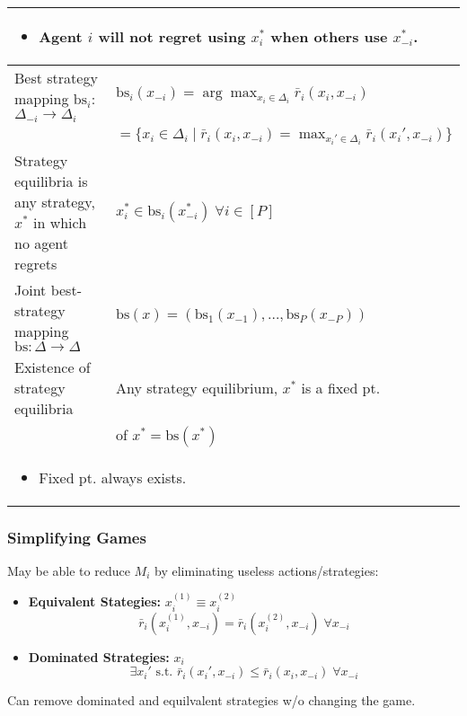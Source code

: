 \begin{summary}
\begin{center}
\begin{tabular}{ll}
            \multicolumn{2}{p{\linewidth}}{
                \begin{itemize}
                    \item Agent $i$ will not regret using $x_i^*$ when others use $x_{-i}^*$.
                \end{itemize}} \\
            \midrule
            Best strategy mapping $\text{bs}_i$: $\Delta_{-i} \to \Delta_i$ & $\text{bs}_i (x_{-i}) = \arg \max_{x_i \in \Delta_i} \bar{r}_i (x_i,x_{-i})$ \\
            & $ = \{x_i \in \Delta_i \mid \bar{r}_i (x_i,x_{-i}) = \max_{x_i' \in \Delta_i} \bar{r}_i (x_i',x_{-i})\}$ \\
            \midrule
            Strategy equilibria is any strategy, $x^*$ in which no agent regrets & $x_i^* \in \text{bs}_i (x_{-i}^*) \; \forall i \in [P]$ \\
            \midrule
            Joint best-strategy mapping $\text{bs}: \Delta \to \Delta$ & $\text{bs}(x) = (\text{bs}_1(x_{-1}),\ldots,\text{bs}_P(x_{-P}))$ \\
            \midrule
            Existence of strategy equilibria & Any strategy equilibrium, $x^*$ is a fixed pt. \\
            & of $x^* = \text{bs}(x^*)$ \\
            \multicolumn{2}{p{\linewidth}}{
                \begin{itemize}
                    \item Fixed pt. always exists. 
                \end{itemize}} \\
            \bottomrule            
        \end{tabular}
    \end{center}
\end{summary}

\subsubsection{Simplifying Games}
\begin{notes} May be able to reduce $M_i$ by eliminating useless actions/strategies: 
    \begin{itemize}
        \item \textbf{Equivalent Stategies:} $x_i^{(1)} \equiv x_i^{(2)}$
        \begin{equation*}
            \bar{r}_i(x_i^{(1)},x_{-i}) = \bar{r}_i(x_i^{(2)},x_{-i}) \; \forall x_{-i} 
        \end{equation*}
        \item \textbf{Dominated Strategies:} $x_i$ 
        \begin{equation*}
            \exists x_i' \text{ s.t. } \bar{r}_i(x_i',x_{-i}) \leq \bar{r}_i(x_i,x_{-i}) \; \forall x_{-i}
        \end{equation*}
    \end{itemize}
    Can remove dominated and equilvalent strategies w/o changing the game. 
\end{notes}
\newpage

